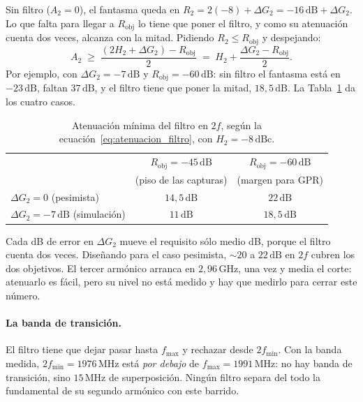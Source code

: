 \documentclass[12pt, a4paper, twoside]{report}
\begin{document}
Sin filtro ($A_2 = 0$), el fantasma queda en $R_2 = 2(-8) + \Delta G_2 =
-16\,\text{dB} + \Delta G_2$. Lo que falta para llegar a $R_\text{obj}$ lo
tiene que poner el filtro, y como su atenuación cuenta dos veces, alcanza con
la mitad. Pidiendo $R_2 \leq R_\text{obj}$ y despejando:
\begin{equation}
  A_2 \;\geq\; \frac{(2H_2 + \Delta G_2) - R_\text{obj}}{2}
  \;=\; H_2 + \frac{\Delta G_2 - R_\text{obj}}{2}.
  \label{eq:atenuacion_filtro}
\end{equation}
Por ejemplo, con $\Delta G_2 = -7\,\text{dB}$ y $R_\text{obj} =
-60\,\text{dB}$: sin filtro el fantasma está en $-23\,\text{dB}$, faltan
$37\,\text{dB}$, y el filtro tiene que poner la mitad, $18{,}5\,\text{dB}$.
La Tabla~\ref{tab:atenuacion_filtro} da los cuatro casos.

\begin{table}[H]
  \centering
  \caption{Atenuación mínima del filtro en $2f$, según la
  ecuación~\eqref{eq:atenuacion_filtro}, con $H_2 = -8\,\text{dBc}$.}
  \label{tab:atenuacion_filtro}
  \begin{tabular}{lcc}
    \toprule
    & $R_\text{obj} = -45\,\text{dB}$ & $R_\text{obj} = -60\,\text{dB}$ \\
    & (piso de las capturas) & (margen para GPR) \\
    \midrule
    $\Delta G_2 = 0$ (pesimista) & $14{,}5\,\text{dB}$ & $22\,\text{dB}$ \\
    $\Delta G_2 = -7\,\text{dB}$ (simulación) & $11\,\text{dB}$ &
      $18{,}5\,\text{dB}$ \\
    \bottomrule
  \end{tabular}
\end{table}

Cada dB de error en $\Delta G_2$ mueve el requisito sólo medio dB, porque el
filtro cuenta dos veces. Diseñando para el caso pesimista, $\sim\!20$ a
$22\,\text{dB}$ en $2f$ cubren los dos objetivos. El tercer armónico arranca
en $2{,}96\,\text{GHz}$, una vez y media el corte: atenuarlo es fácil, pero
su nivel no está medido y hay que medirlo para cerrar este número.

\paragraph{La banda de transición.} El filtro tiene que dejar pasar hasta
$f_\text{max}$ y rechazar desde $2f_\text{min}$. Con la banda medida,
$2f_\text{min} = 1976\,\text{MHz}$ está \emph{por debajo} de $f_\text{max} =
1991\,\text{MHz}$: no hay banda de transición, sino $15\,\text{MHz}$ de
superposición. Ningún filtro separa del todo la fundamental de su segundo
armónico con este barrido.
\end{document}
